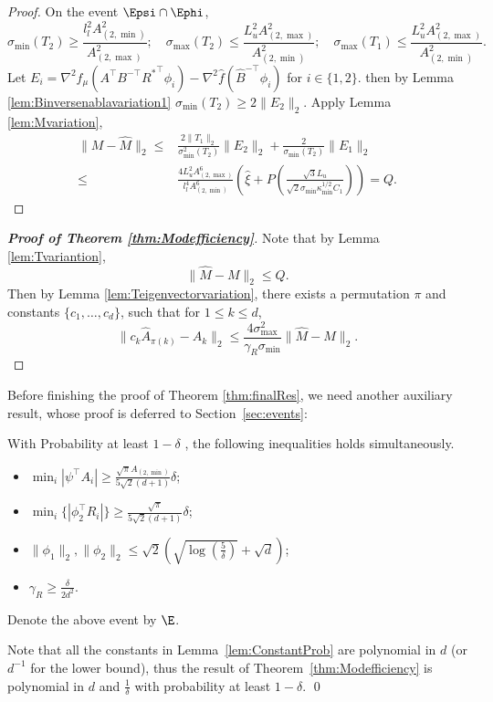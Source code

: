 \begin{proof}
On the event $\Epsi\cap\Ephi$,
\[
\sigma_{\min}(T_2) \ge \frac{l_l^2A^2_{(2,\min)}}{A^2_{(2,\max)}}; \quad \sigma_{\max}(T_2) \le \frac{L_u^2A^2_{(2,\max)}}{A^2_{(2,\min)}};  \quad \sigma_{\max}(T_1) \le \frac{L_u^2A^2_{(2,\max)}}{A^2_{(2,\min)}}. 
\]
Let $E_i = \nabla^2 f_{\mu}(A^{\top}B^{-\top}{R^*}^{\top}\phi_i) - \nabla^2 \hat{f}(\hat{B}^{-\top}\phi_i)$ for  $i\in\{1,2\}$. then by 
Lemma \ref{lem:Binversenablavariation1} $\sigma_{\min}(T_2) \ge 2\|E_2\|_2$.
Apply Lemma \ref{lem:Mvariation},
\begin{align*}
\|M - \hat{M}\|_2 \le &
\frac{2\|T_1\|_2}{\sigma^2_{\min}(T_2)}\|E_2\|_2 + \frac{2}{\sigma_{\min}(T_2)}\|E_1\|_2 \\
\le & \frac{4L_u^2A^6_{(2,\max)}}{l_l^4 A^6_{(2,\min)}}\left(\hat{\xi}
+
P\left(\frac{\sqrt{3}L_u}{\sqrt{2}\sigma_{\min}\kappa_{\min}^{1/2}C_1}\right)\right) = Q.
\end{align*}
\end{proof}
\begin{proof}[{\bf Proof of Theorem \ref{thm:Modefficiency}}]
Note that by Lemma \ref{lem:Tvariantion},
\[
\|\hat{M} - M\|_2 \le Q.
\]
Then by Lemma \ref{lem:Teigenvectorvariation}, there exists a permutation $\pi$ and constants $\{c_1,\ldots,c_d\}$, such that for $1\le k\le d$,
\[
\| c_k\hat{A}_{\pi(k)} - A_k\|_2 \le \frac{4\sigma^2_{\max}}{\gamma_R\sigma_{\min}} \|\hat{M} - M\|_2.
\]
\end{proof}

Before finishing the proof of Theorem \ref{thm:finalRes}, we need another auxiliary result, whose proof is deferred to Section~\ref{sec:events}:
\begin{lemma}
\label{lem:ConstantProb}
With Probability at least $1-\delta$ , the following inequalities holds simultaneously.
\begin{itemize}
\vspace{-3mm}
\item $\min_i |\psi^{\top}A_i| \ge \frac{\sqrt{\pi}A_{(2,\min)}}{5\sqrt{2}(d+1)} \delta$;
\item $\min_i \{|\phi_2^{\top}R_i|\} \ge \frac{\sqrt{\pi}}{5\sqrt{2}(d+1)}\delta$;
\item $\|\phi_1\|_2, \|\phi_2\|_2 \le \sqrt{2}\left(\sqrt{\log(\frac{5}{\delta})}+\sqrt{d}\right)$;
\item $\gamma_R \ge\frac{\delta}{2d^2}$.
\end{itemize}
\vspace{-2mm}
\end{lemma}
Denote the above event by $\E$.
\begin{remark}
Note that all the constants in Lemma~\ref{lem:ConstantProb} are polynomial in $d$ (or $d^{-1}$ for the lower bound), thus the result of Theorem~\ref{thm:Modefficiency} is polynomial in $d$ and $\frac{1}{\delta}$ with probability at least $1-\delta$. \qed
\end{remark}


